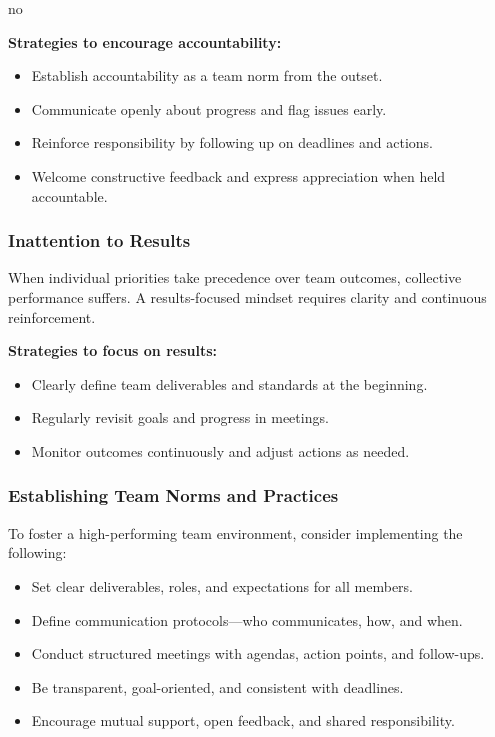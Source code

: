 no\documentclass{article}
\begin{document}
\vspace{1em}
\textbf{Strategies to encourage accountability:}
\begin{itemize}
    \item Establish accountability as a team norm from the outset.
    \item Communicate openly about progress and flag issues early.
    \item Reinforce responsibility by following up on deadlines and actions.
    \item Welcome constructive feedback and express appreciation when held accountable.
\end{itemize}

\subsubsection{Inattention to Results}

When individual priorities take precedence over team outcomes, collective performance suffers. A results-focused mindset requires clarity and continuous reinforcement.

\vspace{1em}
\textbf{Strategies to focus on results:}
\begin{itemize}
    \item Clearly define team deliverables and standards at the beginning.
    \item Regularly revisit goals and progress in meetings.
    \item Monitor outcomes continuously and adjust actions as needed.
\end{itemize}

\subsubsection{Establishing Team Norms and Practices}

To foster a high-performing team environment, consider implementing the following:

\begin{itemize}
    \item Set clear deliverables, roles, and expectations for all members.
    \item Define communication protocols—who communicates, how, and when.
    \item Conduct structured meetings with agendas, action points, and follow-ups.
    \item Be transparent, goal-oriented, and consistent with deadlines.
    \item Encourage mutual support, open feedback, and shared responsibility.
\end{itemize}
\end{document}
